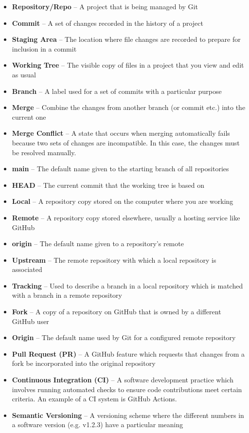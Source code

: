 \documentclass[9pt]{extarticle}
\def\itempad{-1pt}
\begin{document}
\begin{bluebox}[title=Glossary]
  \begin{itemize}
    \itemsep\itempad
    \item \textbf{Repository/Repo} -- A project that is being managed by Git
    \item \textbf{Commit} -- A set of changes recorded in the history of
      a project
    \item \textbf{Staging Area} -- The location where file changes are recorded to
      prepare for inclusion in a commit
    \item \textbf{Working Tree} -- The visible copy of files in a project that you view
      and edit as usual
    \item \textbf{Branch} -- A label used for a set of commits with a particular
      purpose
    \item \textbf{Merge} -- Combine the changes from another branch (or commit etc.)
      into the current one
    \item \textbf{Merge Conflict} -- A state that occurs when merging automatically
      fails because two sets of changes are incompatible. In this case, the changes must
      be resolved manually.
    \item \textbf{main} -- The default name given to the starting branch of all
      repositories
    \item \textbf{HEAD} -- The current commit that the working tree is based on
    \item \textbf{Local} -- A repository copy stored on the computer where you are
      working
    \item \textbf{Remote} -- A repository copy stored elsewhere, usually a hosting
      service like GitHub
    \item \textbf{origin} -- The default name given to a repository's remote
    \item \textbf{Upstream} -- The remote repository with which a local repository is
      associated
    \item \textbf{Tracking} -- Used to describe a branch in a local repository which is
      matched with a branch in a remote repository
    \item \textbf{Fork} -- A copy of a repository on GitHub that is owned by a different
      GitHub user
    \item \textbf{Origin} -- The default name used by Git for a configured remote
      repository
    \item \textbf{Pull Request (PR)} -- A GitHub feature which requests that changes from a
      fork be incorporated into the original repository
    \item \textbf{Continuous Integration (CI)} -- A software development practice which
      involves running automated checks to ensure code contributions meet certain
      criteria. An example of a CI system is GitHub Actions.
    \item \textbf{Semantic Versioning} -- A versioning scheme where the different
      numbers in a software version (e.g. v1.2.3) have a particular meaning
  \end{itemize}
\end{bluebox}
\end{document}
